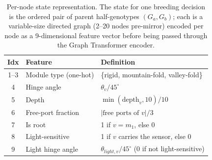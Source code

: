 \documentclass[12pt,a4paper]{report}
\begin{document}
\begin{table}[htbp]
\centering
\footnotesize
\caption{Per-node state representation. The state for one breeding decision is the ordered pair of parent half-genotypes $(G_a, G_b)$; each is a variable-size directed graph (2--20 nodes pre-mirror) encoded per node as a 9-dimensional feature vector before being passed through the Graph Transformer encoder.}
\label{tab:state-space-appendix}
\begin{tabular}{@{}cp{4cm}p{7cm}@{}}
\toprule
\textbf{Idx} & \textbf{Feature} & \textbf{Definition} \\
\midrule
1--3 & Module type (one-hot) & \{rigid, mountain-fold, valley-fold\} \\
4 & Hinge angle & $\theta_v / 45^{\circ}$ \\
5 & Depth & $\min(\text{depth}_v, 10) / 10$ \\
6 & Free-port fraction & $|\text{free ports of } v| / 3$ \\
7 & Is root & 1 if $v = m_1$, else 0 \\
8 & Light-sensitive & 1 if $v$ carries the sensor, else 0 \\
9 & Light hinge angle & $\theta_{light,v} / 45^{\circ}$ (0 if not light-sensitive) \\
\bottomrule
\end{tabular}
\end{table}
\end{document}
